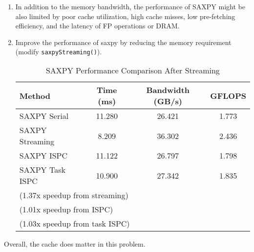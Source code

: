 \documentclass[letterpaper,11pt]{exam}
\begin{document}
\begin{questions}
\begin{enumerate}[label=\roman*.]
        \item In addition to the memory bandwidth, the performance of SAXPY might be also limited by poor cache utilization, high cache misses, low pre-fetching efficiency, and the latency of FP operations or DRAM.
        \item Improve the performance of saxpy by reducing the memory requirement (modify \texttt{saxpyStreaming()}).
              \captionsetup{font=small, labelfont=bf}
              \begin{table}[h!]
                  \centering
                  \caption{SAXPY Performance Comparison After Streaming}
                  \begin{tabular}{@{}lccc@{}}
                      \toprule
                      \textbf{Method} & \textbf{Time (ms)} & \textbf{Bandwidth (GB/s)} & \textbf{GFLOPS} \\
                      \midrule
                      SAXPY Serial    & 11.280             & 26.421                    & 1.773           \\
                      SAXPY Streaming & 8.209              & 36.302                    & 2.436           \\
                      SAXPY ISPC      & 11.122             & 26.797                    & 1.798           \\
                      SAXPY Task ISPC & 10.900             & 27.342                    & 1.835           \\
                      \midrule
                      \multicolumn{4}{l}{(1.37x speedup from streaming)}                                 \\
                      \multicolumn{4}{l}{(1.01x speedup from ISPC)}                                      \\
                      \multicolumn{4}{l}{(1.03x speedup from task ISPC)}                                 \\
                      \bottomrule
                  \end{tabular}
                  \label{tab:saxpy_comparison}
              \end{table}



    \end{enumerate}

    Overall, the cache does matter in this problem.



\end{questions}
\end{document}

